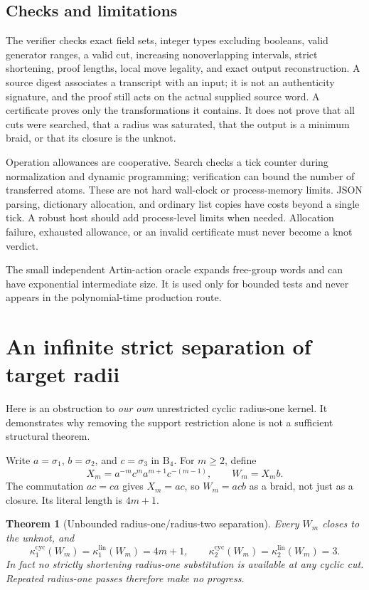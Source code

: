 \documentclass[11pt,a4paper]{article}
\newtheorem{theorem}{Theorem}[section]
\theoremstyle{definition}\newtheorem{definition}[theorem]{Definition}
\theoremstyle{remark}\newtheorem{remark}[theorem]{Remark}
\newcommand{\B}{\mathrm B}
\newcommand{\kc}[1]{\kappa^{\mathrm{cyc}}_{#1}}
\newcommand{\kl}[1]{\kappa^{\mathrm{lin}}_{#1}}
\begin{document}
\subsection{Checks and limitations}
The verifier checks exact field sets, integer types excluding booleans,
valid generator ranges, a valid cut, increasing nonoverlapping intervals,
strict shortening, proof lengths, local move legality, and exact output
reconstruction. A source digest associates a transcript with an input; it
is not an authenticity signature, and the proof still acts on the actual
supplied source word. A certificate proves only the transformations it
contains. It does not prove that all cuts were searched, that a radius was
saturated, that the output is a minimum braid, or that its closure is the
unknot.

Operation allowances are cooperative. Search checks a tick counter during
normalization and dynamic programming; verification can bound the number
of transferred atoms. These are not hard wall-clock or process-memory
limits. JSON parsing, dictionary allocation, and ordinary list copies have
costs beyond a single tick. A robust host should add process-level limits
when needed. Allocation failure, exhausted allowance, or an invalid
certificate must never become a knot verdict.

The small independent Artin-action oracle expands free-group words and can
have exponential intermediate size. It is used only for bounded tests and
never appears in the polynomial-time production route.

\section{An infinite strict separation of target radii}\label{sec:rectangle}

Here is an obstruction to \emph{our own} unrestricted cyclic radius-one
kernel. It demonstrates why removing the support restriction alone is not
a sufficient structural theorem.

Write $a=\sigma_1$, $b=\sigma_2$, and $c=\sigma_3$ in $\B_4$. For $m\ge2$,
define
\begin{equation}\label{eq:rectangle}
 X_m=a^{-m}c^m a^{m+1}c^{-(m-1)},\qquad W_m=X_m b.
\end{equation}
The commutation $ac=ca$ gives $X_m=ac$, so $W_m=acb$ as a braid, not just
as a closure. Its literal length is $4m+1$.

\begin{theorem}[Unbounded radius-one/radius-two separation]\label{thm:separation}
Every $W_m$ closes to the unknot, and
\[
 \boxed{\kc{1}(W_m)=\kl{1}(W_m)=4m+1,\qquad
        \kc{2}(W_m)=\kl{2}(W_m)=3.}
\]
In fact no strictly shortening radius-one substitution is available at any
cyclic cut. Repeated radius-one passes therefore make no progress.
\end{theorem}
\end{document}
